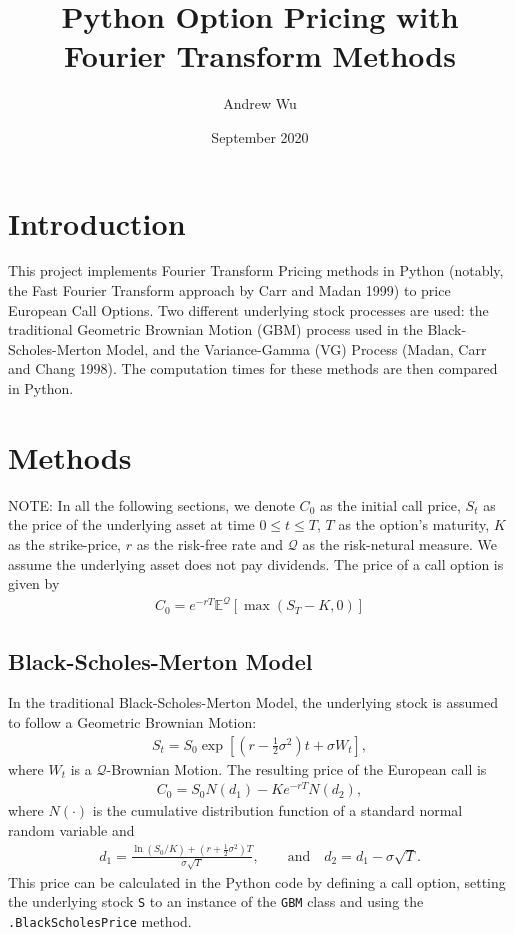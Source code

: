 \documentclass[11pt]{article}
\title{\textbf{Python Option Pricing with Fourier Transform Methods}}
\author{Andrew Wu}
\date{September 2020}
\newcommand{\E}{\mathbb{E}}
\newcommand{\Q}{\mathcal{Q}}
\begin{document}
	\maketitle
	\section{Introduction}
	This project implements Fourier Transform Pricing methods in Python (notably, the Fast Fourier Transform approach by Carr and Madan 1999) to price European Call Options. Two different underlying stock processes are used: the traditional Geometric Brownian Motion (GBM) process used in the Black-Scholes-Merton Model, and the Variance-Gamma (VG) Process (Madan, Carr and Chang 1998). The computation times for these methods are then compared in Python.
	\section{Methods}
		NOTE: In all the following sections, we denote \( C_{0} \) as the initial call price, \( S_t \) as the price of the underlying asset at time \(0\leq t \leq T\), \( T \) as the option's maturity, \( K \) as the strike-price, \( r \) as the risk-free rate and \( \Q \) as the risk-netural measure. We assume the underlying asset does not pay dividends. The price of a call option is given by 
		\begin{align*}
			C_{0} = e^{-rT} \E^{\Q} \left[\max(S_T - K, 0)\right]
		\end{align*}
		\subsection{Black-Scholes-Merton Model}
		In the traditional Black-Scholes-Merton Model, the underlying stock is assumed to follow a Geometric Brownian Motion:
		\begin{align*}
			S_t = S_0 \exp\left[\left(r - \frac{1}{2} \sigma^2\right)t + \sigma W_t\right],
		\end{align*}
		where \( W_t \) is a \( \Q \)-Brownian Motion. The resulting price of the European call is 
		\begin{align*}
			C_{0} = S_{0} N(d_1) - Ke^{-rT}N(d_2),
		\end{align*}
		where \( N(\cdot) \) is the cumulative distribution function of a standard normal random variable and 
		\begin{align*}
			d_1 = \frac{\ln\left(S_0/K\right) + \left(r + \frac{1}{2}\sigma^2\right)T}{\sigma\sqrt{T}}, \qquad\text{and}\quad d_2 = d_1 - \sigma\sqrt{T}.
		\end{align*}
		This price can be calculated in the Python code by defining a call option, setting the underlying stock \texttt{S} to an instance of the \texttt{GBM} class and using the \colorbox{gray!25}{\texttt{.BlackScholesPrice}} method.\\\\
\end{document}
